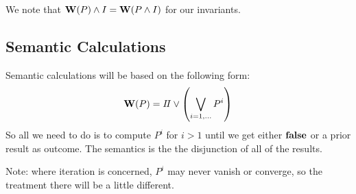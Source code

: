 
We note that $\mathbf{W}(P) \land I = \mathbf{W}(P \land I)$ for our invariants.

\newpage
\subsection{Semantic Calculations}

Semantic calculations will be based on the following form:
\[
  \mathbf{W}(P) = I\!I \lor \left(\bigvee_{i=1,\dots} P^i\right)
\]
So all we need to do is to compute $P^i$ for $i>1$
until we get either $\mathbf{false}$ or a prior result as outcome.
The semantics is the the disjunction of all of the results.

Note: where iteration is concerned, $P^i$ may never vanish
or converge, so the treatment there will be a little different.


